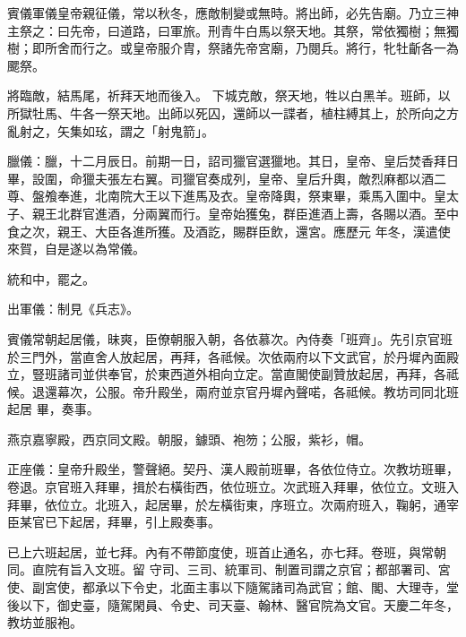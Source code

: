 
\begin{pinyinscope}

 賓儀軍儀皇帝親征儀，常以秋冬，應敵制變或無時。將出師，必先告廟。乃立三神主祭之：曰先帝，曰道路，曰軍旅。刑青牛白馬以祭天地。其祭，常依獨樹；無獨樹；即所舍而行之。或皇帝服介胄，祭諸先帝宮廟，乃閱兵。將行，牝牡齗各一為颸祭。



 將臨敵，結馬尾，祈拜天地而後入。
 下城克敵，祭天地，牲以白黑羊。班師，以所獄牡馬、牛各一祭天地。出師以死囚，還師以一諜者，植柱縛其上，於所向之方亂射之，矢集如玹，謂之「射鬼箭」。



 臘儀：臘，十二月辰日。前期一日，詔司獵官選獵地。其日，皇帝、皇后焚香拜日畢，設圍，命獵夫張左右翼。司獵官奏成列，皇帝、皇后升輿，敵烈麻都以酒二尊、盤飧奉進，北南院大王以下進馬及衣。皇帝降輿，祭東畢，乘馬入圍中。皇太子、親王北群官進酒，分兩翼而行。皇帝始獲兔，群臣進酒上壽，各賜以酒。至中食之次，親王、大臣各進所獲。及酒訖，賜群臣飲，還宮。應歷元
 年冬，漢遣使來賀，自是遂以為常儀。



 統和中，罷之。



 出軍儀：制見《兵志》。



 賓儀常朝起居儀，昧爽，臣僚朝服入朝，各依慕次。內侍奏「班齊」。先引京官班於三門外，當直舍人放起居，再拜，各祗候。次依兩府以下文武官，於丹墀內面殿立，豎班諸司並供奉官，於東西道外相向立定。當直閣使副贊放起居，再拜，各祗候。退還幕次，公服。帝升殿坐，兩府並京官丹墀內聲喏，各祗候。教坊司同北班起居
 畢，奏事。



 燕京嘉寧殿，西京同文殿。朝服，鐻頭、袍笏；公服，紫衫，帽。



 正座儀：皇帝升殿坐，警聲絕。契丹、漢人殿前班畢，各依位侍立。次教坊班畢，卷退。京官班入拜畢，揖於右橫街西，依位班立。次武班入拜畢，依位立。文班入拜畢，依位立。北班入，起居畢，於左橫街東，序班立。次兩府班入，鞠躬，通宰臣某官已下起居，拜畢，引上殿奏事。



 已上六班起居，並七拜。內有不帶節度使，班首止通名，亦七拜。卷班，與常朝同。直院有旨入文班。留
 守司、三司、統軍司、制置司謂之京官；都部署司、宮使、副宮使，都承以下令史，北面主事以下隨駕諸司為武官；館、閣、大理寺，堂後以下，御史臺，隨駕閑員、令史、司天臺、翰林、醫官院為文官。天慶二年冬，教坊並服袍。




\end{pinyinscope}
